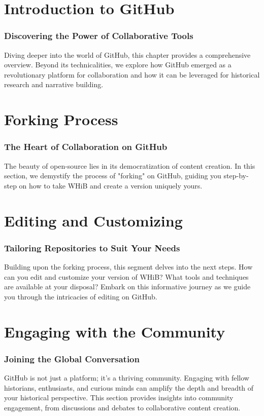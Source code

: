 \documentclass[a4paper,12pt]{book}
\begin{document}
\chapter{Introduction to GitHub}
\subsection*{Discovering the Power of Collaborative Tools}
Diving deeper into the world of GitHub, this chapter provides a comprehensive overview. Beyond its technicalities, we explore how GitHub emerged as a revolutionary platform for collaboration and how it can be leveraged for historical research and narrative building.

\chapter{Forking Process}
\subsection*{The Heart of Collaboration on GitHub}
The beauty of open-source lies in its democratization of content creation. In this section, we demystify the process of "forking" on GitHub, guiding you step-by-step on how to take WHiB and create a version uniquely yours.

\chapter{Editing and Customizing}
\subsection*{Tailoring Repositories to Suit Your Needs}
Building upon the forking process, this segment delves into the next steps. How can you edit and customize your version of WHiB? What tools and techniques are available at your disposal? Embark on this informative journey as we guide you through the intricacies of editing on GitHub.

\chapter{Engaging with the Community}
\subsection*{Joining the Global Conversation}
GitHub is not just a platform; it's a thriving community. Engaging with fellow historians, enthusiasts, and curious minds can amplify the depth and breadth of your historical perspective. This section provides insights into community engagement, from discussions and debates to collaborative content creation.
\end{document}
